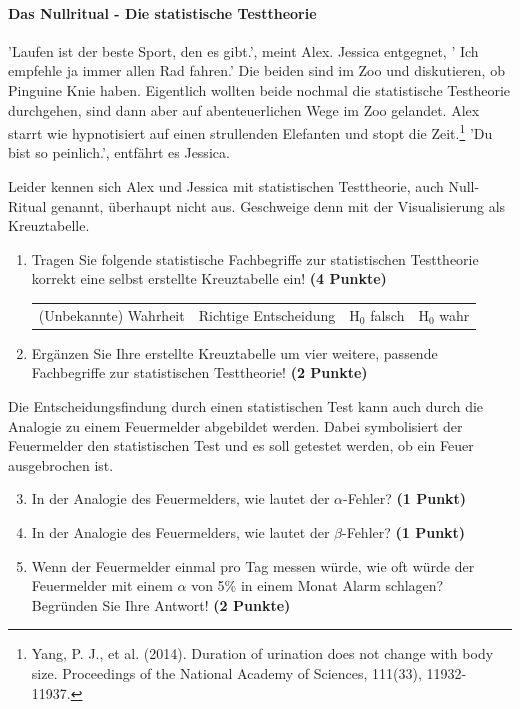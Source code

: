 \documentclass[a4paper, 9pt]{scrartcl}\usepackage[]{graphicx}\usepackage[]{xcolor}
\begin{document}
\ifcollection
\paragraph{Das Nullritual - Die statistische Testtheorie}
\fi

'Laufen ist der beste Sport, den es gibt.', meint Alex. Jessica entgegnet, ' Ich empfehle ja immer allen Rad fahren.' Die beiden sind im Zoo und diskutieren, ob Pinguine Knie haben. Eigentlich wollten beide nochmal die statistische Testheorie durchgehen, sind dann aber auf abenteuerlichen Wege im Zoo gelandet. Alex starrt wie hypnotisiert auf einen strullenden Elefanten und stopt die Zeit.\footnote{Yang, P. J., et al. (2014). Duration of urination does not change with body size. Proceedings of the National Academy of Sciences, 111(33), 11932-11937.} 'Du bist so peinlich.', entfährt es Jessica.

\vspace{1ex}

Leider kennen sich Alex und Jessica mit statistischen Testtheorie, auch Null-Ritual genannt, überhaupt nicht aus. Geschweige denn mit der Visualisierung als Kreuztabelle.  

\begin{enumerate}
\item Tragen Sie folgende statistische Fachbegriffe zur statistischen Testtheorie korrekt eine selbst erstellte Kreuztabelle ein! \textbf{(4 Punkte)}
  \begin{center}
  \begin{tabular}{cccc}
  (Unbekannte) Wahrheit & Richtige Entscheidung & H$_0$ falsch & H$_0$ wahr \\
  \end{tabular}
  \end{center}
\item Ergänzen Sie Ihre erstellte Kreuztabelle um vier weitere, passende Fachbegriffe zur statistischen Testtheorie! \textbf{(2 Punkte)}
\end{enumerate}

Die Entscheidungsfindung durch einen statistischen Test kann auch durch die Analogie zu einem Feuermelder abgebildet werden. Dabei symbolisiert der Feuermelder den statistischen Test und es soll getestet werden, ob ein Feuer ausgebrochen ist.

\begin{enumerate}
  \setcounter{enumi}{2}    
\item In der Analogie des Feuermelders, wie lautet der $\alpha$-Fehler? \textbf{(1 Punkt)}
\item In der Analogie des Feuermelders, wie lautet der $\beta$-Fehler? \textbf{(1 Punkt)}
\item Wenn der Feuermelder einmal pro Tag messen würde, wie oft würde der Feuermelder mit einem $\alpha$ von 5\% in einem Monat Alarm schlagen? Begründen Sie Ihre Antwort! \textbf{(2 Punkte)}
\end{enumerate}
\end{document}
